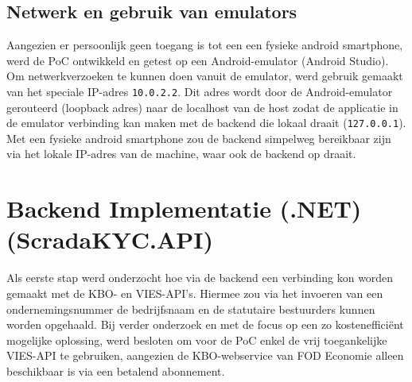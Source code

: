 \subsection{Netwerk en gebruik van emulators}
Aangezien er persoonlijk geen toegang is tot een een fysieke android smartphone,
werd de PoC ontwikkeld en getest op een Android-emulator (Android Studio). \\ Om netwerkverzoeken te kunnen doen vanuit de emulator, werd gebruik gemaakt van het speciale IP-adres \texttt{10.0.2.2}.
Dit adres wordt door de Android-emulator gerouteerd (loopback adres) naar de localhost van de host zodat de applicatie in de emulator verbinding kan maken met de backend die lokaal draait (\texttt{127.0.0.1}).
Met een fysieke android smartphone zou de backend simpelweg bereikbaar zijn via het lokale IP-adres van de machine, waar ook de backend op draait.

\section{Backend Implementatie (.NET) (ScradaKYC.API)}
Als eerste stap werd onderzocht hoe via de backend een verbinding kon worden gemaakt met de KBO- en VIES-API's.
Hiermee zou via het invoeren van een ondernemingsnummer de bedrijfsnaam en de statutaire bestuurders kunnen worden opgehaald. Bij verder onderzoek
en met de focus op een zo kostenefficiënt mogelijke oplossing, werd besloten om voor de PoC enkel de vrij toegankelijke VIES-API te gebruiken,
aangezien de KBO-webservice van FOD Economie alleen beschikbaar is via een betalend abonnement.

